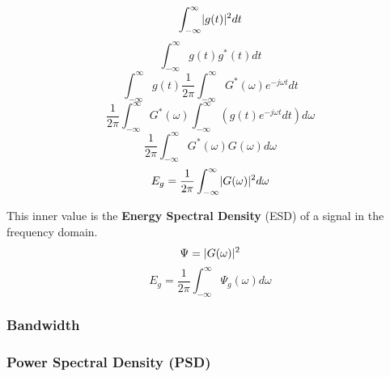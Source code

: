 \documentclass[11pt]{article}
\DeclarePairedDelimiter{\abs}{\lvert}{\rvert}
\begin{document}
$$\int^{\infty}_{-\infty}\abs{g(t)}^2dt$$
$$\int^{\infty}_{-\infty}g(t)g^*(t)dt$$
$$\int^{\infty}_{-\infty}g(t)\frac{1}{2\pi}\int^{\infty}_{-\infty}G^*(\omega)e^{-j\omega t}dt$$
$$\frac{1}{2\pi}\int^{\infty}_{-\infty}G^*(\omega)\int^{\infty}_{-\infty}(g(t)e^{-j\omega t}dt)d\omega$$
$$\frac{1}{2\pi}\int^{\infty}_{-\infty}G^*(\omega)G(\omega)d\omega$$
$$E_g = \frac{1}{2\pi}\int^{\infty}_{-\infty}\abs{G(\omega)}^2d\omega$$

This inner value is the \textbf{Energy Spectral Density} (ESD) of a signal in the frequency domain. \\ 

$$\Psi = \abs{G(\omega)}^2$$
$$E_g = \frac{1}{2\pi}\int^{\infty}_{-\infty}\Psi_g(\omega)d\omega$$

\subsubsection{Bandwidth}


\subsubsection{Power Spectral Density (PSD)}
\end{document}
